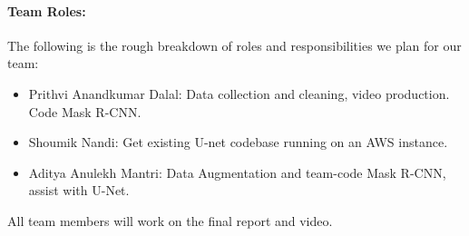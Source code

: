 \documentclass[11pt]{article}
\begin{document}
    \paragraph{Team Roles:} The following is the rough breakdown of roles and responsibilities we plan for our team:
    \begin{itemize}
        \item Prithvi Anandkumar Dalal: Data collection and cleaning, video production.  Code Mask R-CNN.
        \item Shoumik Nandi: Get existing U-net codebase running on an AWS instance.
        \item Aditya Anulekh Mantri: Data Augmentation and team-code Mask R-CNN, assist with U-Net.
    \end{itemize}
    All team members will work on the final report and video.

\end{document}
